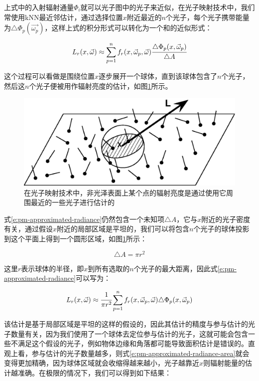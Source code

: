 \noindent 上式中的入射辐射通量$\Phi_i$就可以光子图中的光子来近似，在光子映射技术中，我们常使用kNN最近邻估计，通过选择位置$x$附近最近的$n$个光子，每个光子携带能量为$\triangle\Phi_p(\vec{\omega_p})$，这样上式的积分形式可以转化为一个和的近似形式：

\begin{equation}\label{e:pm-approximated-radiance}
	L_r(x,\vec{\omega})\approx \sum^{n}_{p=1}f_r(x,\vec{\omega}_p,\vec{\omega}) \cfrac{\triangle\Phi_p(x,\vec{\omega}_p)}{\triangle A}
\end{equation}

\noindent 这个过程可以看做是围绕位置$x$逐步展开一个球体，直到该球体包含了$n$个光子，然后这$n$个光子便被用作辐射亮度的估计，如图\ref{f:pm-sphere-estimate}所示。

\begin{figure}
\sidecaption
	\includegraphics[width=.5\textwidth]{figures/pm/radiance-estimate}
	\caption{在光子映射技术中，非光泽表面上某个点的辐射亮度是通过使用它周围最近的一些光子进行估计的}
	\label{f:pm-sphere-estimate}
\end{figure}

式\ref{e:pm-approximated-radiance}仍然包含一个未知项$\triangle A$，它与$x$附近的光子密度有关，通过假设$x$附近的局部区域是平坦的，我们可以将包含$n$个光子的球体投影到这个平面上得到一个圆形区域，如图\ref{f:pm-sphere-estimate}所示：

\begin{equation}
	\triangle A=\pi r^{2}
\end{equation}

\noindent 这里$r$表示球体的半径，即$x$到所有选取的$n$个光子的最大距离，因此式\ref{e:pm-approximated-radiance}可以写为：

\begin{equation}\label{e:pm-approximated-radiance-area}
	L_r(x,\vec{\omega})\approx  \cfrac{1}{\pi r^{2}}\sum^{n}_{p=1}f_r(x,\vec{\omega}_p,\vec{\omega})\triangle\Phi_p(x,\vec{\omega}_p)
\end{equation}
 
\noindent 该估计是基于局部区域是平坦的这样的假设的，因此其估计的精度与参与估计的光子数量有关，因为我们使用了一个球体去定位参与估计的光子，这就可能会包含一些不满足这个假设的光子，例如物体边缘和角落都可能导致面积估计是错误的。直观上看，参与估计的光子数量越多，则式\ref{e:pm-approximated-radiance-area}就会变得更加精确，因为球体区域就会收缩得越来越小，光子越靠近$x$则辐射能量的估计越准确。在极限的情况下，我们可以得到如下结果： 

